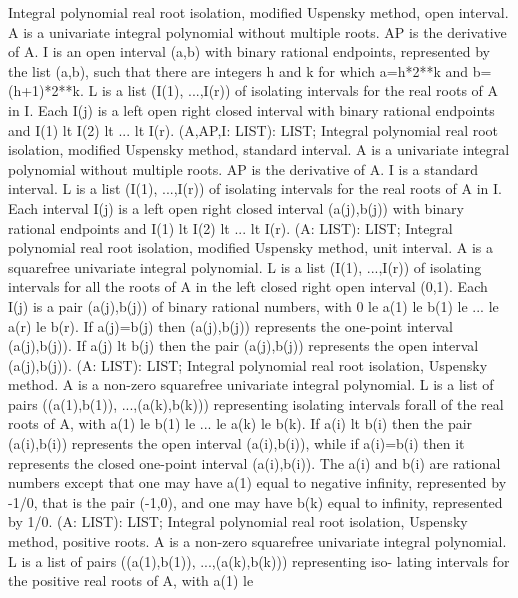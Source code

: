 \bcom Integral polynomial real root isolation, modified Uspensky method, open interval.
A is a univariate integral polynomial without multiple roots.  
AP is the derivative of A.  I is an open interval (a,b) with
binary rational endpoints, represented by the list (a,b), such that
there are integers h and k for which a=h*2**k and b=(h+1)*2**k.
L is a list (I(1), ...,I(r)) of isolating intervals for the real roots
of A in I.  Each I(j) is a left open right closed interval with binary
rational endpoints and I(1) lt I(2) lt ... lt I(r). \ecom 
{} (A,AP,I: LIST): LIST; \eproc
\bcom Integral polynomial real root isolation, modified Uspensky method, standard interval.
A is a univariate integral polynomial without multiple roots.  
AP is the derivative of A.  I is a standard interval.
L is a list (I(1), ...,I(r)) of isolating intervals for the real roots
of A in I.  Each interval I(j) is a left open right closed interval
(a(j),b(j)) with binary rational endpoints and I(1) lt I(2) lt  ...
lt I(r). \ecom 
{} (A: LIST): LIST; \eproc
\bcom Integral polynomial real root isolation, modified Uspensky method, unit interval.
A is a squarefree univariate integral polynomial.  L is
a list (I(1), ...,I(r)) of isolating intervals for all the roots of A
in the left closed right open interval (0,1).  Each I(j) is a pair
(a(j),b(j)) of binary rational numbers, with 0 le a(1) le b(1) le
 ... le a(r) le b(r).  If a(j)=b(j) then (a(j),b(j))
represents the one-point interval (a(j),b(j)).  If a(j) lt b(j)
then the pair  (a(j),b(j)) represents the open interval
(a(j),b(j)). \ecom 
{} (A: LIST): LIST; \eproc
\bcom Integral polynomial real root isolation, Uspensky method. A is a
non-zero squarefree univariate integral polynomial.  L is a list of
pairs  ((a(1),b(1)), ...,(a(k),b(k))) representing isolating
intervals forall of the real roots of A, with a(1) le b(1) le  ... le
a(k) le b(k).  If a(i) lt b(i) then the pair
(a(i),b(i)) represents the open interval (a(i),b(i)), while
if a(i)=b(i) then it represents the closed one-point interval
(a(i),b(i)).  The a(i) and b(i) are rational numbers except
that one may have a(1) equal to negative infinity, represented by
-1/0, that is the pair (-1,0), and one may have b(k) equal to
infinity, represented by 1/0. \ecom 
{} (A: LIST): LIST; \eproc
\bcom Integral polynomial real root isolation, Uspensky method, positive roots.
A is a non-zero squarefree univariate integral polynomial.  L
is a list of pairs ((a(1),b(1)), ...,(a(k),b(k))) representing iso-
lating intervals for the positive real roots of A, with a(1) le
